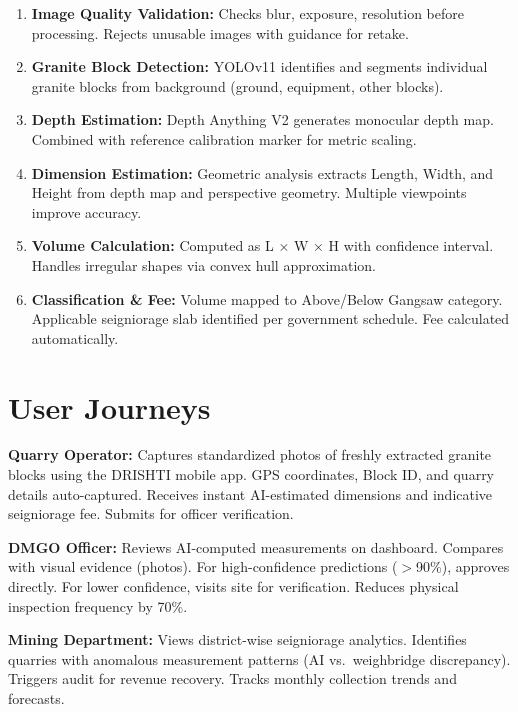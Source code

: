 \documentclass[11pt,a4paper]{article}
\begin{document}
\begin{enumerate}[leftmargin=1.5em, itemsep=4pt]
  \item \textbf{Image Quality Validation:} Checks blur, exposure, resolution before processing. Rejects unusable images with guidance for retake.
  \item \textbf{Granite Block Detection:} YOLOv11 identifies and segments individual granite blocks from background (ground, equipment, other blocks).
  \item \textbf{Depth Estimation:} Depth Anything V2 generates monocular depth map. Combined with reference calibration marker for metric scaling.
  \item \textbf{Dimension Estimation:} Geometric analysis extracts Length, Width, and Height from depth map and perspective geometry. Multiple viewpoints improve accuracy.
  \item \textbf{Volume Calculation:} Computed as L × W × H with confidence interval. Handles irregular shapes via convex hull approximation.
  \item \textbf{Classification \& Fee:} Volume mapped to Above/Below Gangsaw category. Applicable seigniorage slab identified per government schedule. Fee calculated automatically.
\end{enumerate}

\section{User Journeys}

\textbf{Quarry Operator:} Captures standardized photos of freshly extracted granite blocks using the DRISHTI mobile app. GPS coordinates, Block ID, and quarry details auto-captured. Receives instant AI-estimated dimensions and indicative seigniorage fee. Submits for officer verification.

\textbf{DMGO Officer:} Reviews AI-computed measurements on dashboard. Compares with visual evidence (photos). For high-confidence predictions ($>$90\%), approves directly. For lower confidence, visits site for verification. Reduces physical inspection frequency by 70\%.

\textbf{Mining Department:} Views district-wise seigniorage analytics. Identifies quarries with anomalous measurement patterns (AI vs.\ weighbridge discrepancy). Triggers audit for revenue recovery. Tracks monthly collection trends and forecasts.

\end{document}
